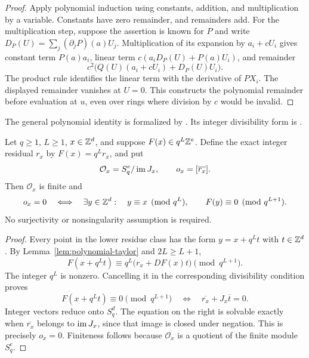 \begin{proof}
Apply polynomial induction using constants, addition, and multiplication by a
variable. Constants have zero remainder, and remainders add. For the
multiplication step, suppose the assertion is known for $P$ and write
$D_P(U)=\sum_j(\partial_jP)(a)U_j$. Multiplication of its expansion by
$a_i+cU_i$ gives constant term $P(a)a_i$, linear term
$c(a_iD_P(U)+P(a)U_i)$, and remainder
\[
 c^2\bigl(Q(U)(a_i+cU_i)+D_P(U)U_i\bigr).
\]
The product rule identifies the linear term with the derivative of
$PX_i$. The displayed remainder vanishes at $U=0$. This constructs the
polynomial remainder before evaluation at $u$, even over rings where
division by $c$ would be invalid.
\end{proof}

The general polynomial identity is formalized by
.
Its integer divisibility form is
.

\begin{theorem}\label{thm:finite-polynomial-obstruction}
Let $q\ge1$, $L\ge1$, $x\in\mathbb Z^d$, and suppose
$F(x)\in q^L\mathbb Z^e$. Define the exact integer residual $r_x$ by
$F(x)=q^Lr_x$, and put
\[
 \mathcal O_x=S_q^e/\operatorname{im} J_x,\qquad o_x=[\overline{r_x}].
\]
Then $\mathcal O_x$ is finite and
\begin{equation}\label{eq:finite-obstruction}
 o_x=0\quad\Longleftrightarrow\quad
 \exists y\in\mathbb Z^d:\quad
 y\equiv x\pmod{q^L},\qquad F(y)\equiv0\pmod{q^{L+1}}.
\end{equation}
No surjectivity or nonsingularity assumption is required.
\end{theorem}

\begin{proof}
Every point in the lower residue class has the form $y=x+q^Lt$ with
$t\in\mathbb Z^d$. By Lemma~\ref{lem:polynomial-taylor} and $2L\ge L+1$,
\[
 F(x+q^Lt)\equiv q^L\bigl(r_x+DF(x)t\bigr)\pmod{q^{L+1}}.
\]
The integer $q^L$ is nonzero. Cancelling it in the corresponding divisibility
condition proves
\begin{equation}\label{eq:digit-correction}
 F(x+q^Lt)\equiv0\pmod{q^{L+1}}
 \quad\Longleftrightarrow\quad
 \overline{r_x}+J_x\overline t=0.
\end{equation}
Integer vectors reduce onto $S_q^d$. The equation on the right is solvable
exactly when $\overline{r_x}$ belongs to $\operatorname{im} J_x$, since that image is
closed under negation. This is precisely $o_x=0$. Finiteness follows because
$\mathcal O_x$ is a quotient of the finite module $S_q^e$.
\end{proof}

